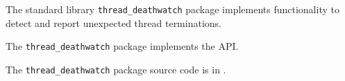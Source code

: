 
The standard library {\tt thread\_deathwatch} package implements functionality to detect and report unexpected thread terminations.

The {\tt thread\_deathwatch} package implements the  API.

The {\tt thread\_deathwatch} package source code is in .








